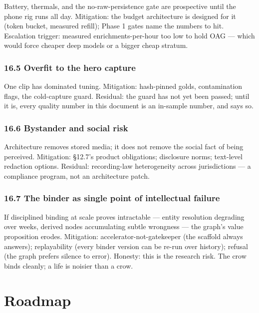 Battery, thermals, and the no-raw-persistence gate are prospective until the phone rig runs all day. Mitigation: the budget architecture is designed for it (token bucket, measured refill); Phase 1 gates name the numbers to hit. Escalation trigger: measured enrichments-per-hour too low to hold OAG --- which would force cheaper deep models or a bigger cheap stratum.

\subsection{16.5 Overfit to the hero capture}\label{overfit-to-the-hero-capture}

One clip has dominated tuning. Mitigation: hash-pinned golds, contamination flags, the cold-capture guard. Residual: the guard has not yet been passed; until it is, every quality number in this document is an in-sample number, and says so.

\subsection{16.6 Bystander and social risk}\label{bystander-and-social-risk}

Architecture removes stored media; it does not remove the social fact of being perceived. Mitigation: \S{}12.7's product obligations; disclosure norms; text-level redaction options. Residual: recording-law heterogeneity across jurisdictions --- a compliance program, not an architecture patch.

\subsection{16.7 The binder as single point of intellectual failure}\label{the-binder-as-single-point-of-intellectual-failure}

If disciplined binding at scale proves intractable --- entity resolution degrading over weeks, derived nodes accumulating subtle wrongness --- the graph's value proposition erodes. Mitigation: accelerator-not-gatekeeper (the scaffold always answers); replayability (every binder version can be re-run over history); refusal (the graph prefers silence to error). Honesty: this is the research risk. The crow binds cleanly; a life is noisier than a crow.

\chapter{Roadmap}\label{roadmap}

